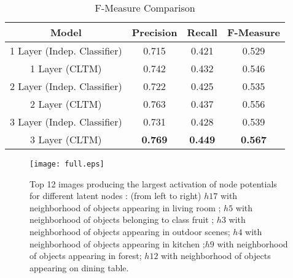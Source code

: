 \documentclass{article}
\begin{document}
\begin{table}[ht]
\caption{F-Measure  Comparison}




\centering
\begin{tabular}{|c c c c|}
\hline\hline
Model & Precision & Recall & F-Measure \\ [0.3ex]
\hline
1 Layer (Indep. Classifier) & 0.715 & 0.421 & 0.529 \\
1 Layer (CLTM) & 0.742 & 0.432 & 0.546 \\
2 Layer (Indep. Classifier) & 0.722 & 0.425 & 0.535 \\
2 Layer (CLTM) & 0.763 & 0.437 & 0.556 \\
3 Layer (Indep. Classifier) & 0.731 & 0.428 & 0.539 \\
3 Layer (CLTM)  & \textbf{0.769} & \textbf{0.449} & \textbf{0.567} \\
\hline
\end{tabular}
\label{table:nonlin}
\end{table}

\begin{figure}
\begin{center}

\texttt{[image: full.eps]}

\end{center}

\caption{Top 12 images producing the largest activation of node potentials for different latent nodes : (from left to right) $h17$  with neighborhood of objects appearing in living room ; $h5$ with neighborhood of objects belonging to class fruit ; $h3$ with neighborhood of objects appearing in outdoor scenes; $h4$ with neighborhood of objects appearing in kitchen ;$h9$ with neighborhood of objects appearing in forest; $h12$ with neighborhood of objects appearing on dining table. }
\label{fig:topkimages}

\end{figure}



\end{document}
